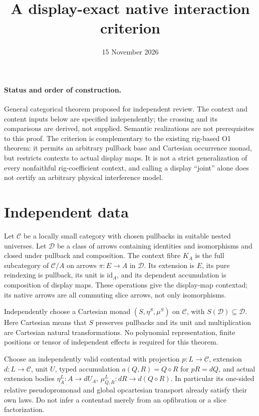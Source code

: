 \documentclass[11pt]{article}
\title{A display-exact native interaction criterion}
\date{15 November 2026}
\begin{document}
\maketitle
\paragraph{Status and order of construction.} General categorical theorem proposed for independent review. The context and content inputs below are specified independently; the crossing and its comparisons are derived, not supplied. Semantic realizations are not prerequisites to this proof. The criterion is complementary to the existing rig-based O1 theorem: it permits an arbitrary pullback base and Cartesian occurrence monad, but restricts contexts to actual display maps. It is not a strict generalization of every nonfaithful rig-coefficient context, and calling a display ``joint'' alone does not certify an arbitrary physical interference model.

\section{Independent data}
Let $\mathcal C$ be a locally small category with chosen pullbacks in suitable nested universes. Let $\mathcal D$ be a class of arrows containing identities and isomorphisms and closed under pullback and composition. The context fibre $K_A$ is the full subcategory of $\mathcal C/A$ on arrows $\pi:E\to A$ in $\mathcal D$. Its extension is $E$, its pure reindexing is pullback, its unit is $\mathrm{id}_A$, and its dependent accumulation is composition of display maps. These operations give the display-map contextad; its native arrows are all commuting slice arrows, not only isomorphisms.

Independently choose a Cartesian monad $(S,\eta^S,\mu^S)$ on $\mathcal C$, with $S(\mathcal D)\subseteq\mathcal D$. Here Cartesian means that $S$ preserves pullbacks and its unit and multiplication are Cartesian natural transformations. No polynomial representation, finite positions or tensor of independent effects is required for this theorem.

Choose an independently valid contentad with projection $p:L\to\mathcal C$, extension $d:L\to\mathcal C$, unit $U$, typed accumulation $a(Q,R)=Q\diamond R$ for $pR=dQ$, and actual extension bodies $\eta^L_A:A\to dU_A$, $\mu^L_{Q,R}:dR\to d(Q\diamond R)$. In particular its one-sided relative pseudopromonad and global opcartesian transport already satisfy their own laws. Do not infer a contentad merely from an opfibration or a slice factorization.
\end{document}
